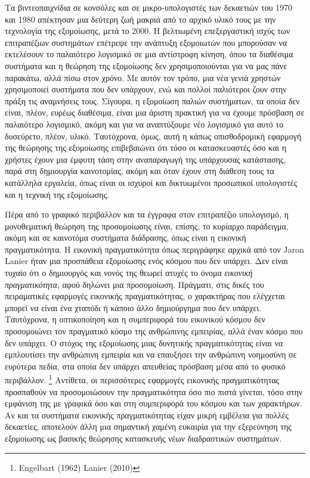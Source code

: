 \documentclass[
]{article}
\begin{document}
Τα βιντεοπαιχνίδια σε κονσόλες και σε μικρο-υπολογιστές των δεκαετιών
του 1970 και 1980 απέκτησαν μια δεύτερη ζωή μακριά από το αρχικό υλικό
τους με την τεχνολογία της εξομοίωσης, μετά το 2000. Η βελτιωμένη
επεξεργαστική ισχύς των επιτραπέζιων συστημάτων επέτρεψε την ανάπτυξη
εξομοιωτών που μπορούσαν να εκτελέσουν το παλαιότερο λογισμικό σε μια
αντίστροφη κίνηση, όπου τα διαθέσιμα συστήματα και η θεώρηση της
εξομοίωσης δεν χρησιμοποιούνται για να μας πάνε παρακάτω, αλλά πίσω στον
χρόνο. Με αυτόν τον τρόπο, μια νέα γενιά χρηστών χρησιμοποιεί συστήματα
που δεν υπάρχουν, ενώ και πολλοί παλιότεροι ζουν στην πράξη τις
αναμνήσεις τους. Σίγουρα, η εξομοίωση παλιών συστήματων, τα οποία δεν
είναι, πλέον, ευρέως διαθέσιμα, είναι μια άριστη πρακτική για να έχουμε
πρόσβαση σε παλαιότερο λογισμικό, ακόμη και για να αναπτύξουμε νέο
λογισμικό για αυτό το δυσεύρετο, πλέον, υλικό. Ταυτόχρονα, όμως, αυτή η
κάπως οπισθοδρομική εφαρμογή της θεώρησης της εξομοίωσης επιβεβαιώνει
ότι τόσο οι κατασκευαστές όσο και η χρήστες έχουν μια έμφυτη τάση στην
αναπαραγωγή της υπάρχουσας κατάστασης, παρά στη δημιουργία καινοτομίας,
ακόμη και όταν έχουν στη διάθεση τους τα κατάλληλα εργαλεία, όπως είναι
οι ισχυροί και δικτυωμένοι προσωπικοί υπολογιστές και η τεχνική της
εξομοίωσης.

Πέρα από το γραφικό περιβάλλον και τα έγγραφα στον επιτραπέζιο
υπολογισμό, η μονοθεματική θεώρηση της προσομοίωσης είναι, επίσης, το
κυρίαρχο παράδειγμα, ακόμη και σε καινοτόμα συστήματα διάδρασης, όπως
είναι η εικονική πραγματικότητα. Η εικονική πραγματικότητα όπως
περιγράφηκε αρχικά από τον Jaron Lanier ήταν μια προσπάθεια εξομοίωσης
ενός κόσμου που δεν υπάρχει. Δεν είναι τυχαίο ότι ο δημιουργός και νονός
της θεωρεί ατυχές το όνομα \emph{εικονική πραγματικότητα}, αφού δηλώνει
μια προσομοίωση. Πράγματι, στις δικές του πειραματικές εφαρμογές
εικονικής πραγματικότητας, ο χαρακτήρας που ελέγχεται μπορεί να είναι
ένα χταπόδι ή κάποιο άλλο δημιούργημα που δεν υπάρχει. Ταυτόχρονα, η
οπτικοποίηση και η συμπεριφορά του εικονικού κόσμου δεν προσομοιώνει τον
πραγματικό κόσμο της ανθρώπινης εμπειρίας, αλλά έναν κόσμο που δεν
υπάρχει. Ο στόχος της εξομοίωσης μιας δυνητικής πραγματικότητας είναι να
εμπλουτίσει την ανθρώπινη εμπειρία και να επαυξήσει την ανθρώπινη
νοημοσύνη σε ευρύτερα πεδία, στα οποία δεν υπάρχει απευθείας πρόσβαση
μέσα από το φυσικό περιβάλλον. \footnote{Engelbart (1962) Lanier (2010)}
Αντίθετα, οι περισσότερες εφαρμογές εικονικής πραγματικότητας προσπαθούν
να προσομοιώσουν την πραγματικότητα όσο πιο πιστά γίνεται, τόσο στην
εμφάνιση της με γραφικά όσο και στη συμπεριφορά του κόσμου και των
χαρακτήρων. Αν και τα συστήματα εικονικής πραγματικότητας είχαν μικρή
εμβέλεια για πολλές δεκαετίες, αποτελούν άλλη μια σημαντική χαμένη
ευκαιρία για την εξερεύνηση της εξομοίωσης ως βασικής θεώρησης
κατασκευής νέων διαδραστικών συστημάτων.
\end{document}
